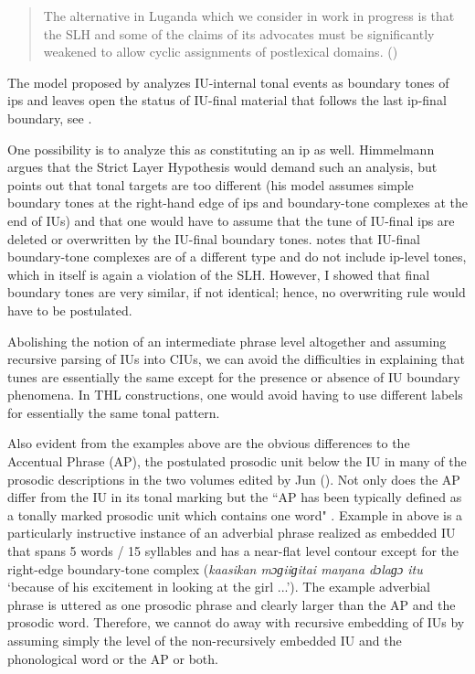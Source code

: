 \begin{quotation}
	The alternative in Luganda which we consider in work in progress is that the SLH and some of the claims of its advocates must be significantly weakened to allow cyclic assignments of postlexical domains.  (\citeyear[107]{Hyman_1987})
\end{quotation}



The model proposed  by \citet[369]{Himmelmann_Preliminary_2018} analyzes IU-internal tonal events as boundary tones of ips and leaves open the status of  IU-final  material that follows the last ip-final boundary, see .





One possibility is to analyze this as  constituting an ip as well. Himmelmann argues that the Strict Layer Hypothesis   \citep[SLH;][]{selkirk1986} would demand such an analysis,  but points out that tonal targets are too different (his model assumes simple boundary tones at the right-hand edge of ips and boundary-tone complexes at the end of IUs) and that one would have to assume that the tune of IU-final ips are deleted or overwritten by the IU-final boundary tones. \citet{Himmelmann_Preliminary_2018} notes that IU-final boundary-tone complexes are of a different type and do not include ip-level tones, which in itself is again a violation of the SLH. However, I showed that  final boundary tones are very similar, if not identical; hence, no overwriting rule would have to be postulated.

Abolishing the notion of an intermediate phrase level altogether and assuming recursive parsing of IUs into CIUs,  we can avoid the difficulties in explaining that tunes are essentially the same except for the presence or absence of IU boundary phenomena. In THL  constructions, one would avoid having to use different labels for essentially the same tonal pattern. 

Also evident from the examples above are the obvious differences to the Accentual Phrase (AP), the postulated prosodic unit below the IU in many of the prosodic descriptions in the two volumes edited by Jun (\citeyear{jun2006, jun_2014}). Not only does the AP  differ from the IU in its tonal marking but the ``AP has been typically defined as a tonally marked prosodic unit which contains one word" \citep[532]{Jun_byProm}. Example   in  	 above is a particularly instructive instance of an adverbial phrase realized as embedded IU  that spans  5 words / 15 syllables and has a near-flat level contour except for the right-edge  boundary-tone complex (\textit{kaasikan mɔɡiiɡitai maŋana dɔlaɡɔ itu} `because of his excitement in looking at the girl ...'). The example adverbial phrase is uttered as one prosodic phrase and clearly larger than the AP and the prosodic word. Therefore, we cannot do away with recursive embedding of IUs by assuming simply the level of the non-recursively embedded IU and the phonological word or the AP or both. 




